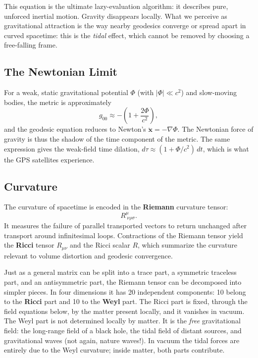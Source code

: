 This equation is the ultimate lazy-evaluation algorithm: it describes pure, unforced inertial motion.
Gravity disappears locally. 
What we perceive as gravitational attraction is the way nearby geodesics converge or spread apart in curved spacetime: 
this is the \emph{tidal} effect, which cannot be removed by choosing a free-falling frame.

\subsection*{The Newtonian Limit}

For a weak, static gravitational potential $\Phi$ (with $|\Phi| \ll c^2$) and slow-moving bodies, the metric is approximately
\begin{equation}
g_{00} \approx -\left(1 + \frac{2\Phi}{c^2}\right),
\end{equation}
and the geodesic equation reduces to Newton's $\ddot{\mathbf{x}} = -\nabla \Phi$.
The Newtonian force of gravity is thus the shadow of the time component of the metric.
The same expression gives the weak-field time dilation, $d\tau \approx (1 + \Phi/c^2)\,dt$, which is what the GPS satellites experience.


\subsection*{Curvature}

The curvature of spacetime is encoded in the \textbf{Riemann} curvature tensor:
\begin{equation}
R^\mu_{\;\nu\rho\sigma}.
\end{equation}
It measures the failure of parallel transported vectors to return unchanged after transport around infinitesimal loops.
Contractions of the Riemann tensor yield the \textbf{Ricci} tensor $R_{\mu\nu}$ and the Ricci scalar $R$, which summarize the curvature relevant to volume distortion and geodesic convergence.

Just as a general matrix can be split into a trace part, a symmetric traceless part, and an antisymmetric part, the Riemann tensor can be decomposed into simpler pieces.
In four dimensions it has 20 independent components: 10 belong to the \textbf{Ricci} part and 10 to the \textbf{Weyl} part.
The Ricci part is fixed, through the field equations below, by the matter present locally, and it vanishes in vacuum.
The Weyl part is not determined locally by matter. It is the \emph{free} gravitational field: the long-range field of a black hole, 
the tidal field of distant sources, and gravitational waves (not again, nature waves!).
In vacuum the tidal forces are entirely due to the Weyl curvature; inside matter, both parts contribute.

